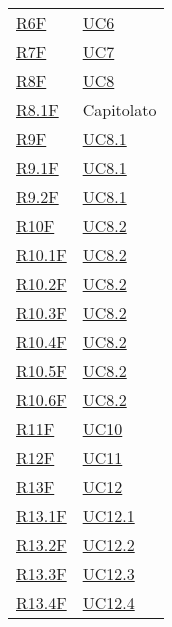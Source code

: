 \begin{center}
\begin{longtable}[!h]{p{50px} p{50px}}
        \hyperref[tab:RequisitiFunzionali]{R6F}      & \hyperref[sec:UC6]{UC6}       \\
        \hyperref[tab:RequisitiFunzionali]{R7F}      & \hyperref[sec:UC7]{UC7}       \\
        \hyperref[tab:RequisitiFunzionali]{R8F}      & \hyperref[sec:UC8]{UC8}       \\
        \hyperref[tab:RequisitiFunzionali]{R8.1F}    & Capitolato                    \\
        \hyperref[tab:RequisitiFunzionali]{R9F}      & \hyperref[sec:UC8.1]{UC8.1}   \\
        \hyperref[tab:RequisitiFunzionali]{R9.1F}    & \hyperref[sec:UC8.1]{UC8.1}   \\
        \hyperref[tab:RequisitiFunzionali]{R9.2F}    & \hyperref[sec:UC8.1]{UC8.1}   \\
        \hyperref[tab:RequisitiFunzionali]{R10F}     & \hyperref[sec:UC8.2]{UC8.2}   \\
        \hyperref[tab:RequisitiFunzionali]{R10.1F}   & \hyperref[sec:UC8.2]{UC8.2}   \\
        \hyperref[tab:RequisitiFunzionali]{R10.2F}   & \hyperref[sec:UC8.2]{UC8.2}   \\
        \hyperref[tab:RequisitiFunzionali]{R10.3F}   & \hyperref[sec:UC8.2]{UC8.2}   \\
        \hyperref[tab:RequisitiFunzionali]{R10.4F}   & \hyperref[sec:UC8.2]{UC8.2}   \\
        \hyperref[tab:RequisitiFunzionali]{R10.5F}   & \hyperref[sec:UC8.2]{UC8.2}   \\
        \hyperref[tab:RequisitiFunzionali]{R10.6F}   & \hyperref[sec:UC8.2]{UC8.2}   \\
        \hyperref[tab:RequisitiFunzionali]{R11F}     & \hyperref[sec:UC10]{UC10}     \\
        \hyperref[tab:RequisitiFunzionali]{R12F}     & \hyperref[sec:UC11]{UC11}     \\
        \hyperref[tab:RequisitiFunzionali]{R13F}     & \hyperref[sec:UC12]{UC12}     \\
        \hyperref[tab:RequisitiFunzionali]{R13.1F}   & \hyperref[sec:UC12.1]{UC12.1} \\
        \hyperref[tab:RequisitiFunzionali]{R13.2F}   & \hyperref[sec:UC12.2]{UC12.2} \\
        \hyperref[tab:RequisitiFunzionali]{R13.3F}   & \hyperref[sec:UC12.3]{UC12.3} \\
        \hyperref[tab:RequisitiFunzionali]{R13.4F}   & \hyperref[sec:UC12.4]{UC12.4} \\

\end{longtable}
\end{center}
